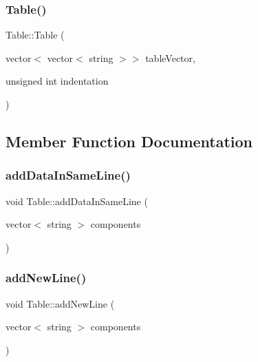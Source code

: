 \hypertarget{class_table_a49c13a4307cb192d0a449f948dda66e2}{}\label{class_table_a49c13a4307cb192d0a449f948dda66e2} 
\subsubsection{\texorpdfstring{Table()}{Table()}\hspace{0.1cm}{\footnotesize\ttfamily [4/4]}}
{\footnotesize\ttfamily Table\+::\+Table (\begin{DoxyParamCaption}\item[{vector$<$ vector$<$ string $>$$>$}]{table\+Vector,  }\item[{unsigned int}]{indentation }\end{DoxyParamCaption})}



\subsection{Member Function Documentation}
\hypertarget{class_table_ac1fcf6cb33298c4fbfa5457e0b276738}{}\label{class_table_ac1fcf6cb33298c4fbfa5457e0b276738} 
\subsubsection{\texorpdfstring{add\+Data\+In\+Same\+Line()}{addDataInSameLine()}}
{\footnotesize\ttfamily void Table\+::add\+Data\+In\+Same\+Line (\begin{DoxyParamCaption}\item[{vector$<$ string $>$}]{components }\end{DoxyParamCaption})}

\hypertarget{class_table_a8d1739ca805a00714d030303124c2927}{}\label{class_table_a8d1739ca805a00714d030303124c2927} 
\subsubsection{\texorpdfstring{add\+New\+Line()}{addNewLine()}}
{\footnotesize\ttfamily void Table\+::add\+New\+Line (\begin{DoxyParamCaption}\item[{vector$<$ string $>$}]{components }\end{DoxyParamCaption})}

